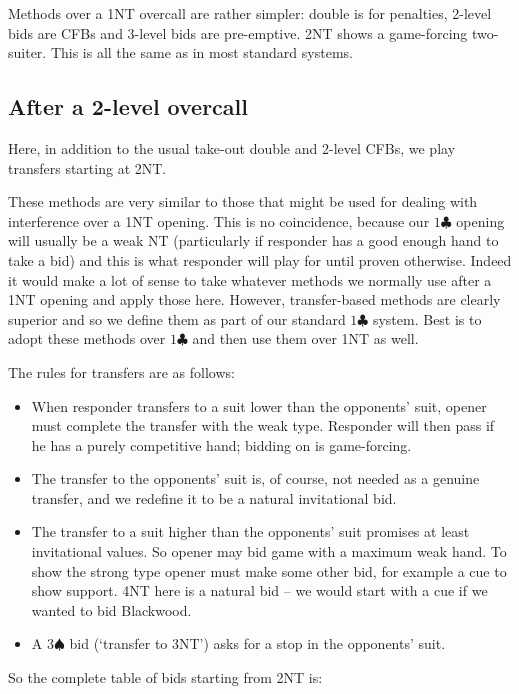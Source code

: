 \documentclass{article}
\newcommand{\sz}{\spadesuit}
\newcommand{\cz}{\clubsuit}
\begin{document}
Methods over a 1NT overcall are rather simpler: double is for penalties, 2-level bids are CFBs and 3-level bids are pre-emptive. 2NT shows a game-forcing two-suiter. This is all the same as in most standard systems.

\subsection{After a 2-level overcall}

Here, in addition to the usual take-out double and 2-level CFBs, we play transfers starting at 2NT.

These methods are very similar to those that might be used for dealing with interference over a 1NT opening. This is no coincidence, because our $1\cz$ opening will usually be a weak NT (particularly if responder has a good enough hand to take a bid) and this is what responder will play for until proven otherwise. Indeed it would make a lot of sense to take whatever methods we normally use after a 1NT opening and apply those here. However, transfer-based methods are clearly superior and so we define them as part of our standard $1\cz$ system. Best is to adopt these methods over $1\cz$ and then use them over 1NT as well.

The rules for transfers are as follows:
\begin{itemize}
\item When responder transfers to a suit lower than the opponents' suit, opener must complete the transfer with the weak type. Responder will then pass if he has a purely competitive hand; bidding on is game-forcing.
\item The transfer to the opponents' suit is, of course, not needed as a genuine transfer, and we redefine it to be a natural invitational bid.
\item The transfer to a suit higher than the opponents' suit promises at least invitational values. So opener may bid game with a maximum weak hand. To show the strong type opener must make some other bid, for example a cue to show support. 4NT here is a natural bid -- we would start with a cue if we wanted to bid Blackwood.
\item A $3\sz$ bid (`transfer to 3NT') asks for a stop in the opponents' suit.
\end{itemize}
So the complete table of bids starting from 2NT is:
\end{document}
